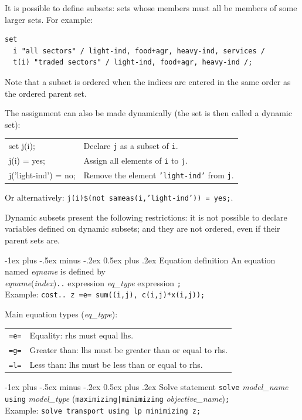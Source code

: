 \documentclass[10pt,landscape,a4paper]{article}
\makeatletter
\renewcommand{\section}{\@startsection{section}{1}{0mm}%
                                {-1ex plus -.5ex minus -.2ex}%
                                {0.5ex plus .2ex}%
                                {\color{blue}\normalfont\large\bfseries}}
\makeatother
\begin{document}
\begin{multicols}{2}
It is possible to define subsets: sets whose members must all be members of some
larger sets. For example:\\
\begin{verbatim}
set
  i "all sectors" / light-ind, food+agr, heavy-ind, services /
  t(i) "traded sectors" / light-ind, food+agr, heavy-ind /;
\end{verbatim}
Note that a subset is ordered when the indices are entered in the same order as
the ordered parent set.

The assignment can also be made dynamically (the set is then called a dynamic
set):
\begin{tabularx}{\columnwidth}{@{}>{\ttfamily}l>{\raggedright\arraybackslash}X@{}}
set j(i);& Declare \texttt{j} as a subset of \texttt{i}. \\
j(i) = yes;& Assign all elements of \texttt{i} to \texttt{j}.\\
j('light-ind') = no;& Remove the element \texttt{'light-ind'} from \texttt{j}.
\end{tabularx}
Or alternatively: \texttt{j(i)\$(not sameas(i,'light-ind')) = yes;}.

Dynamic subsets present the following restrictions: it is not possible to
declare variables defined on dynamic subsets; and they are not ordered, even if
their parent sets are.

\section{Equation definition}
An equation named \emph{eqname} is defined by\\
\emph{eqname}(\emph{index})\verb!..! expression \emph{eq\_type} expression \verb!;!\\
Example: \verb!cost.. z =e= sum((i,j), c(i,j)*x(i,j));!

Main equation types (\emph{eq\_type}):\\
\begin{tabular}{@{}ll@{}}
  \verb!=e=! & Equality: rhs must equal lhs.\\
  \verb!=g=! & Greater than: lhs must be greater than or equal to rhs.\\
  \verb!=l=! & Less than: lhs must be less than or equal to rhs.
\end{tabular}

\columnbreak{}
\section{Solve statement}
\verb!solve! \emph{model\_name} \verb!using! \emph{model\_type} (\verb!maximizing|minimizing! \emph{objective\_name})\verb!;!\\
Example: \verb!solve transport using lp minimizing z;!


\end{multicols}
\end{document}
